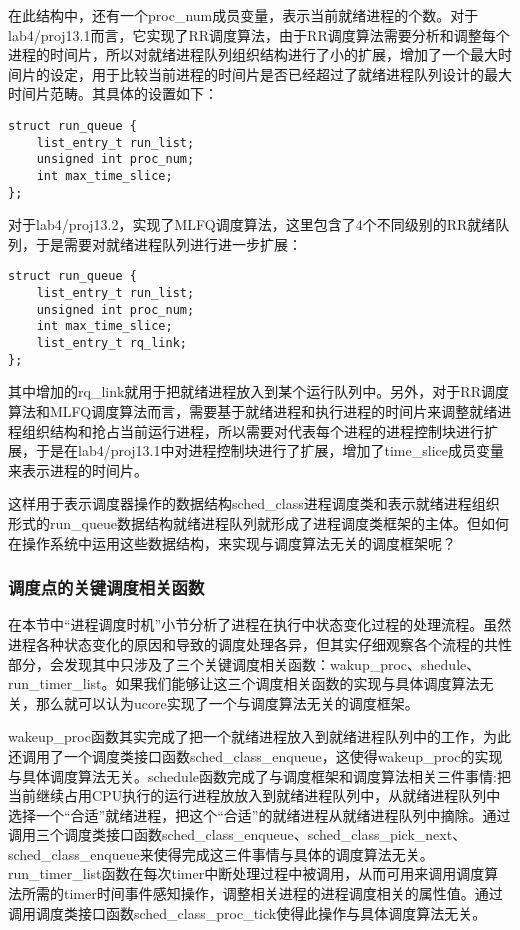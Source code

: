 在此结构中，还有一个proc\_num成员变量，表示当前就绪进程的个数。对于lab4/proj13.1而言，它实现了RR调度算法，由于RR调度算法需要分析和调整每个进程的时间片，所以对就绪进程队列组织结构进行了小的扩展，增加了一个最大时间片的设定，用于比较当前进程的时间片是否已经超过了就绪进程队列设计的最大时间片范畴。其具体的设置如下：

\begin{lstlisting}
struct run_queue {
    list_entry_t run_list;
    unsigned int proc_num;
    int max_time_slice;
};
\end{lstlisting}

对于lab4/proj13.2，实现了MLFQ调度算法，这里包含了4个不同级别的RR就绪队列，于是需要对就绪进程队列进行进一步扩展：

\begin{lstlisting}
struct run_queue {
    list_entry_t run_list;
    unsigned int proc_num;
    int max_time_slice;
    list_entry_t rq_link;
};
\end{lstlisting}

其中增加的rq\_link就用于把就绪进程放入到某个运行队列中。另外，对于RR调度算法和MLFQ调度算法而言，需要基于就绪进程和执行进程的时间片来调整就绪进程组织结构和抢占当前运行进程，所以需要对代表每个进程的进程控制块进行扩展，于是在lab4/proj13.1中对进程控制块进行了扩展，增加了time\_slice成员变量来表示进程的时间片。

这样用于表示调度器操作的数据结构sched\_class进程调度类和表示就绪进程组织形式的run\_queue数据结构就绪进程队列就形成了进程调度类框架的主体。但如何在操作系统中运用这些数据结构，来实现与调度算法无关的调度框架呢？

\subsubsection{调度点的关键调度相关函数}\label{ux8c03ux5ea6ux70b9ux7684ux5173ux952eux8c03ux5ea6ux76f8ux5173ux51fdux6570}

在本节中``进程调度时机''小节分析了进程在执行中状态变化过程的处理流程。虽然进程各种状态变化的原因和导致的调度处理各异，但其实仔细观察各个流程的共性部分，会发现其中只涉及了三个关键调度相关函数：wakup\_proc、shedule、run\_timer\_list。如果我们能够让这三个调度相关函数的实现与具体调度算法无关，那么就可以认为ucore实现了一个与调度算法无关的调度框架。

wakeup\_proc函数其实完成了把一个就绪进程放入到就绪进程队列中的工作，为此还调用了一个调度类接口函数sched\_class\_enqueue，这使得wakeup\_proc的实现与具体调度算法无关。schedule函数完成了与调度框架和调度算法相关三件事情:把当前继续占用CPU执行的运行进程放放入到就绪进程队列中，从就绪进程队列中选择一个``合适''就绪进程，把这个``合适''的就绪进程从就绪进程队列中摘除。通过调用三个调度类接口函数sched\_class\_enqueue、sched\_class\_pick\_next、sched\_class\_enqueue来使得完成这三件事情与具体的调度算法无关。run\_timer\_list函数在每次timer中断处理过程中被调用，从而可用来调用调度算法所需的timer时间事件感知操作，调整相关进程的进程调度相关的属性值。通过调用调度类接口函数sched\_class\_proc\_tick使得此操作与具体调度算法无关。

